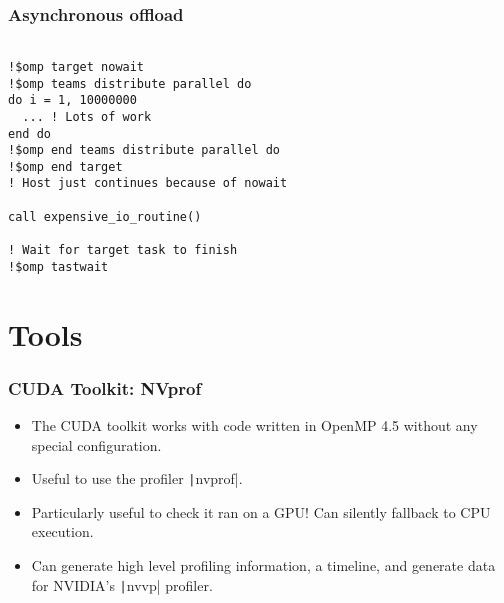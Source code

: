 \documentclass{beamer}
\begin{document}
\begin{frame}[fragile]
\frametitle{Asynchronous offload}
\begin{verbatim}

!$omp target nowait
!$omp teams distribute parallel do
do i = 1, 10000000
  ... ! Lots of work
end do
!$omp end teams distribute parallel do
!$omp end target
! Host just continues because of nowait

call expensive_io_routine()

! Wait for target task to finish
!$omp tastwait

\end{verbatim}
\end{frame}

\section{Tools}
\begin{frame}
\frametitle{CUDA Toolkit: NVprof}
\begin{itemize}
  \item The CUDA toolkit works with code written in OpenMP 4.5 without any special configuration.
  \item Useful to use the profiler \texttt|nvprof|.
  \item Particularly useful to check it ran on a GPU! Can silently fallback to CPU execution.
  \item Can generate high level profiling information, a timeline, and generate data for NVIDIA's \texttt|nvvp| profiler.
\end{itemize}
\end{frame}
\end{document}
